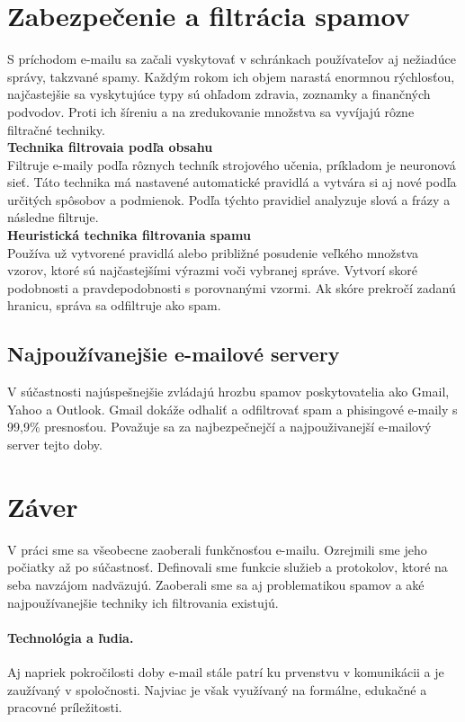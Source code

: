 \documentclass[10pt,twoside,slovak,a4paper]{article}
\begin{document}
\section{Zabezpečenie a filtrácia spamov} 
\begin{flushleft}
S príchodom e-mailu sa začali vyskytovať v schránkach používateľov aj nežiadúce správy, takzvané spamy. Každým rokom ich objem narastá enormnou rýchlosťou, najčastejšie sa vyskytujúce typy sú ohľadom zdravia, zoznamky a finančných podvodov. Proti ich šíreniu a na zredukovanie množstva sa vyvíjajú rôzne filtračné techniky.\cite{heliyon}\\
\vspace{0.4cm}
\textbf{Technika filtrovaia podľa obsahu}\\
\vspace{0.1cm}
Filtruje e-maily podľa rôznych techník strojového učenia, príkladom je neuronová sieť. Táto technika má nastavené automatické pravidlá a vytvára si aj nové podľa určitých spôsobov a podmienok. Podľa týchto pravidiel analyzuje slová a frázy a následne filtruje. \\
\vspace{0.4cm}
\textbf{Heuristická technika filtrovania spamu}\\
\vspace{0.1cm}
Používa už vytvorené pravidlá alebo približné posudenie veľkého množstva vzorov, ktoré sú najčastejšími výrazmi voči vybranej správe. Vytvorí skoré podobnosti a pravdepodobnosti s porovnanými vzormi. Ak skóre prekročí zadanú hranicu, správa sa odfiltruje ako spam. 

\subsection{Najpoužívanejšie e-mailové servery} 
V súčastnosti najúspešnejšie zvládajú hrozbu spamov poskytovatelia ako Gmail, Yahoo a Outlook. Gmail dokáže odhaliť a odfiltrovať spam a phisingové e-maily s 99,9\% presnosťou. Považuje sa za najbezpečnejčí a najpouživanejší e-mailový server tejto doby. \cite{heliyon}


\section{Záver} \label{zaver} %

V práci sme sa všeobecne zaoberali funkčnosťou e-mailu. Ozrejmili sme jeho počiatky až po súčastnosť. Definovali sme funkcie služieb a protokolov, ktoré na seba navzájom nadväzujú. Zaoberali sme sa aj problematikou spamov a aké najpoužívanejšie techniky ich filtrovania existujú. \\
\vspace{-0.2cm}
\paragraph{Technológia a ľudia.}Aj napriek pokročilosti doby e-mail stále patrí ku prvenstvu v komunikácii a je zaužívaný v spoločnosti. Najviac je však využívaný na formálne, edukačné a pracovné príležitosti.  
\end{flushleft}



\end{document}
